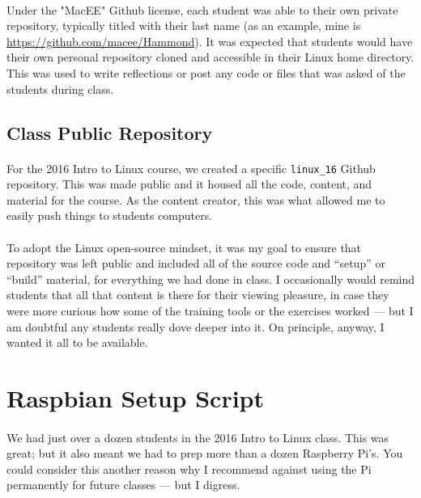 \documentclass[11pt]{article}
\begin{document}
	\paragraph{} Under the "MacEE" Github license, each student was able to their own private repository, typically titled with their last name (as an example, mine is \href{https://github.com/macee/Hammond}{https://github.com/macee/Hammond}). It was expected that students would have their own personal repository cloned and accessible in their Linux home directory. This was used to write reflections or post any code or files that was asked of the students during class. 

	\subsection{Class Public Repository}

	\paragraph{} For the 2016 Intro to Linux course, we created a specific \texttt{linux\_16} Github repository. This was made public and it housed all the code, content, and material for the course. As the content creator, this was what allowed me to easily push things to students computers. 

	\paragraph{} To adopt the Linux open-source mindset, it was my goal to ensure that repository was left public and included all of the source code and ``setup'' or ``build'' material, for everything we had done in class. I occasionally would remind students that all that content is there for their viewing pleasure, in case they were more curious how some of the training tools or the exercises worked --- but I am doubtful any students really dove deeper into it. On principle, anyway, I wanted it all to be available.


	\section{Raspbian Setup Script}

	\paragraph{} We had just over a dozen students in the 2016 Intro to Linux class. This was great; but it also meant we had to prep more than a dozen Raspberry Pi's. You could consider this another reason why I recommend against using the Pi permanently for future classes --- but I digress.
\end{document}

